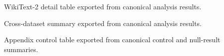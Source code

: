 \documentclass[10pt,twocolumn]{article}
\begin{document}
\begin{table}[t]
  \centering
  \caption{WikiText-2 detail table exported from canonical analysis results.}
  \small
  
\end{table}

\begin{table}[t]
  \centering
  \caption{Cross-dataset summary exported from canonical analysis results.}
  \small
  
\end{table}

\begin{table}[t]
  \centering
  \caption{Appendix control table exported from canonical control and null-result summaries.}
  \small
  
\end{table}

\balance
\end{document}
